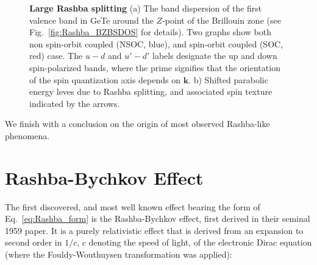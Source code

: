 \begin{figure}[h]
	\begin{subfigure}[b]{0.49\textwidth}
	\caption{}
	\end{subfigure}
	\begin{subfigure}[b]{0.49\textwidth}
	\caption{}
	\end{subfigure}
	\caption{\label{fig:Rashba_intro_dispersion}
		{\bf Large Rashba splitting} (a) The band dispersion of the first valence band in GeTe around the $Z$-point of the Brillouin zone (see Fig.~\ref{fig:Rashba_BZBSDOS} for details). Two graphs show both non spin-orbit coupled (NSOC, blue), and spin-orbit coupled (SOC, red) case. The $u-d$ and $u'-d'$ labels designate the up and down spin-polarized bands, where the prime signifies that the orientation of the spin quantization axis depends on $\bm{k}$. b) Shifted parabolic energy leves due to Rashba splitting, and associated spin texture indicated by the arrows.}
\end{figure}

We finish with a conclusion on the origin of most observed Rashba-like phenomena.

\section{Rashba-Bychkov Effect \label{sec:Rashba_relativistic}}
The first discovered, and most well known effect bearing the form of Eq.~\ref{eq:Rashba_form} is the Rashba-Bychkov effect, first derived in their seminal 1959 paper\cite{Rashba1959SymmetryAr}.
It is a purely relativistic effect that is derived from an expansion to second order in $1/c$, $c$ denoting the speed of light, of the electronic Dirac equation (where the Fouldy-Wouthuysen transformation was applied):

